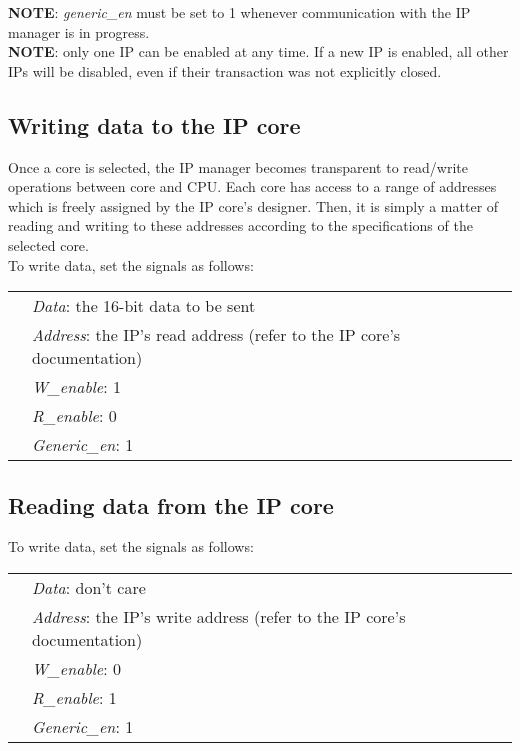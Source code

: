 \textbf{NOTE}: \textit{generic\_en} must be set to 1 whenever communication with the IP manager is in progress.\vspace{0.5cm}\\
\textbf{NOTE}: only one IP can be enabled at any time. If a new IP is enabled, all other IPs will be disabled, even if their transaction was not explicitly closed.


\subsection{Writing data to the IP core} \label{3.2}

Once a core is selected, the IP manager becomes transparent to read/write operations between core and CPU. Each core has access to a range of addresses which is freely assigned by the IP core's designer. Then, it is simply a matter of reading and writing to these addresses according to the specifications of the selected core.\vspace{0.5cm}\\
To write data, set the signals as follows:\vspace{0.5cm}\\
\begin{tabular}{ p{0.7cm} p{14 cm} }
& \textit{Data}: the 16-bit data to be sent\\
&\textit{Address}: the IP's read address (refer to the IP core's documentation)\\
&\textit{W\_enable}: 1\\
&\textit{R\_enable}: 0 \\
&\textit{Generic\_en}: 1
\end{tabular}

\subsection{Reading data from the IP core} \label{3.3}

To write data, set the signals as follows:\\
\vspace{0.5cm}
\begin{tabular}{ p{0.7cm} p{14 cm} }\\
&\textit{Data}: don't care\\
&\textit{Address}: the IP's write address (refer to the IP core's documentation)\\
&\textit{W\_enable}: 0\\
&\textit{R\_enable}: 1\\
&\textit{Generic\_en}: 1\end{tabular}

